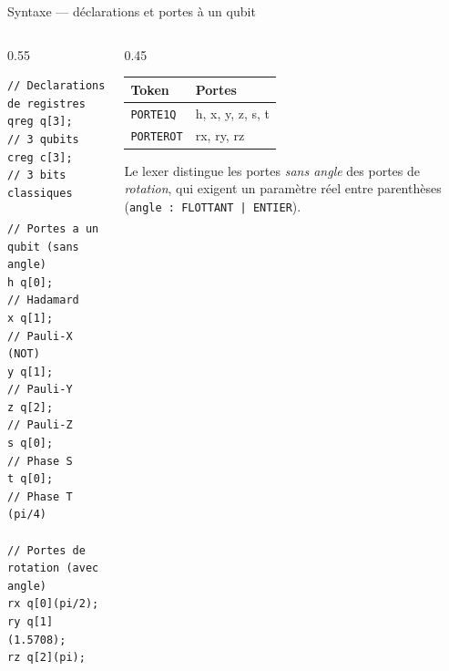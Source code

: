 \documentclass[10pt]{beamer}
\begin{document}
\begin{frame}[fragile]{Syntaxe --- déclarations et portes à un qubit}
  \begin{columns}[T]
    \begin{column}{0.55\textwidth}
\begin{lstlisting}[language=QuantL]
// Declarations de registres
qreg q[3];     // 3 qubits
creg c[3];     // 3 bits classiques

// Portes a un qubit (sans angle)
h q[0];        // Hadamard
x q[1];        // Pauli-X (NOT)
y q[1];        // Pauli-Y
z q[2];        // Pauli-Z
s q[0];        // Phase S
t q[0];        // Phase T (pi/4)

// Portes de rotation (avec angle)
rx q[0](pi/2);
ry q[1](1.5708);
rz q[2](pi);
\end{lstlisting}
    \end{column}
    \begin{column}{0.45\textwidth}
      \begin{keybox}[title=Table des mots-clés porte 1-qubit]
        \small
        \begin{tabular}{ll}
          \toprule
          Token & Portes \\
          \midrule
          \texttt{PORTE1Q} & h, x, y, z, s, t \\
          \texttt{PORTEROT} & rx, ry, rz \\
          \bottomrule
        \end{tabular}
      \end{keybox}
      \vspace{6pt}
      {\small Le lexer distingue les portes \emph{sans angle} des portes de \emph{rotation}, qui exigent un paramètre réel entre parenthèses (\texttt{angle : FLOTTANT | ENTIER}).}
    \end{column}
  \end{columns}
\end{frame}
\end{document}
